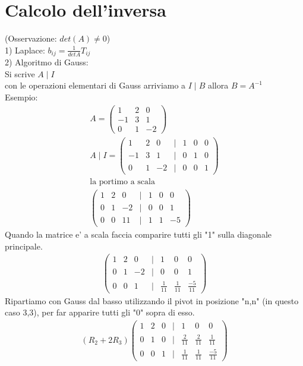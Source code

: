 \documentclass[a4paper,12pt]{article}
\begin{document}
\section{Calcolo dell'inversa}
(Osservazione: $det(A) \neq 0$) \\
1) Laplace: $b_{ij}=\frac{1}{detA}T_{ij}$
\\2) Algoritmo di Gauss: \\
Si scrive $A \mid I$ 
\\ con le operazioni elementari di Gauss arriviamo a $I \mid B$ allora $B=A^{-1}$
\\Esempio:
\begin{align*}
    A=\begin{pmatrix}
        1&2&0\\-1&3&1\\0&1&-2
    \end{pmatrix} \\
    A\mid I=\begin{pmatrix}
    1 & 2 & 0 & | & 1 & 0 & 0 \\
    -1 & 3 & 1 & | & 0 & 1 & 0 \\
    0 & 1 & -2 & | & 0 & 0 & 1
    \end{pmatrix} \\
    \text{la portimo a scala} \\
    \begin{pmatrix}
        1&2&0&|&1&0&0\\
        0&1&-2&|&0&0&1\\
        0&0&11&|&1&1&-5
    \end{pmatrix}
\end{align*}
Quando la matrice e' a scala faccia comparire tutti gli "1" sulla diagonale principale.
\begin{align*}
    \begin{pmatrix}
        1&2&0&|&1&0&0\\
        0&1&-2&|&0&0&1\\
        0&0&1&|&\frac{1}{11}&\frac{1}{11}&\frac{-5}{11}
    \end{pmatrix}
\end{align*}
Ripartiamo con Gauss dal basso utilizzando il pivot in posizione "n,n" (in questo caso 3,3), per far apparire tutti gli "0" sopra di esso.
\begin{align*}
    (R_2+2R_3)
    \begin{pmatrix}
        1&2&0&|&1&0&0\\
        0&1&0&|&\frac{2}{11}&\frac{2}{11}&\frac{1}{11}\\
        0&0&1&|&\frac{1}{11}&\frac{1}{11}&\frac{-5}{11}
    \end{pmatrix}
\end{align*}
\end{document}
